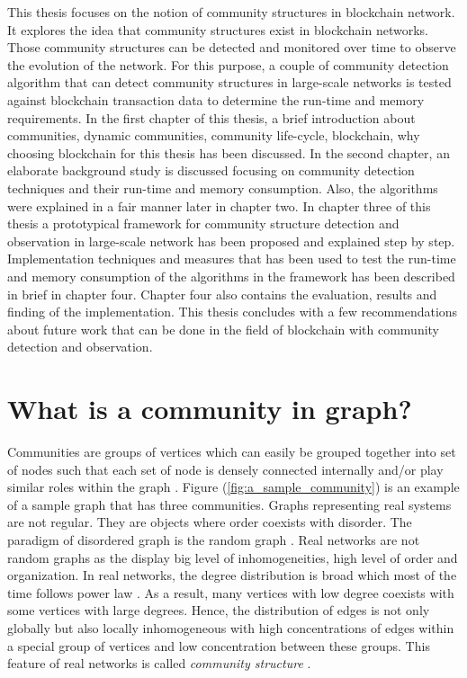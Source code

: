 This thesis focuses on the notion of community structures in blockchain network. It explores the idea that community structures exist in blockchain networks. Those community structures can be detected and monitored over time to observe the evolution of the network. For this purpose, a couple of community detection algorithm that can detect community structures in large-scale networks is tested against blockchain transaction data to determine the run-time and memory requirements. In the first chapter of this thesis, a brief introduction about communities, dynamic communities, community life-cycle, blockchain, why choosing blockchain for this thesis has been discussed. In the second chapter, an elaborate background study is discussed focusing on community detection techniques and their run-time and memory consumption. Also, the algorithms were explained in a fair manner later in chapter two. In chapter three of this thesis a prototypical framework for community structure detection and observation in large-scale network has been proposed and explained step by step. Implementation techniques and measures that has been used to test the run-time and memory consumption of the algorithms in the framework has been described in brief in chapter four. Chapter four also contains the evaluation, results and finding of the implementation. This thesis concludes with a few recommendations about future work that can be done in the field of blockchain with community detection and observation.

\section{What is a community in graph?}\label{community_in_graph}
Communities are groups of vertices which can easily be grouped together into set of nodes such that each set of node is densely connected internally and/or play similar roles within the graph \cite{ref-6}. Figure (\ref{fig:a_sample_community}) is an example of a sample graph that has three communities. Graphs representing real systems are not regular. They are objects where order coexists with disorder. The paradigm of disordered graph is the random graph \cite{ref-21}. Real networks are not random  graphs as the display big level of inhomogeneities, high level of order and organization. In real networks, the degree distribution is broad which most of the time follows power law \cite{ref-6}. As a result, many vertices with low degree coexists with some vertices with large degrees. Hence, the distribution of edges is not only globally but also locally inhomogeneous with high concentrations of edges within a special group of vertices and low concentration between these groups. This feature of real networks is called \textit{community structure} \cite{ref-1}.


